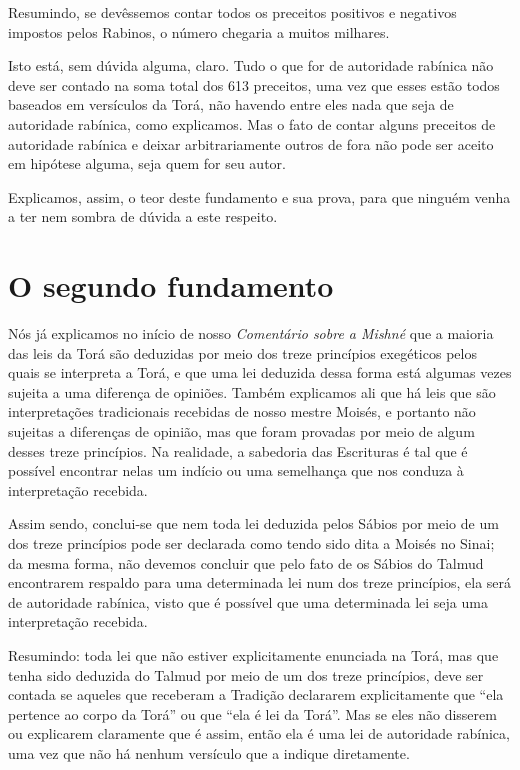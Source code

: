 Resumindo, se devêssemos contar todos os preceitos positivos e
negativos impostos pelos Rabinos, o número chegaria a muitos milhares.

Isto está, sem dúvida alguma, claro. Tudo o que for de autoridade
rabínica não deve ser contado na soma total dos 613 preceitos, uma vez
que esses estão todos baseados em versículos da Torá, não havendo entre
eles nada que seja de autoridade rabínica, como explicamos. Mas o fato
de contar alguns preceitos de autoridade rabínica e deixar
arbitrariamente outros de fora não pode ser aceito em hipótese alguma,
seja quem for seu autor.

Explicamos, assim, o teor deste fundamento e sua prova, para que ninguém
venha a ter nem sombra de dúvida a este respeito.

\chapter*{O segundo fundamento}

Nós já explicamos no início de nosso \emph{Comentário sobre a Mishné}
que a maioria das leis da Torá são deduzidas por meio dos treze
princípios exegéticos pelos quais se interpreta a Torá, e que uma lei
deduzida dessa forma está algumas vezes sujeita a uma diferença de
opiniões. Também explicamos ali que há leis que são interpretações
tradicionais recebidas de nosso mestre Moisés, e portanto não sujeitas
a diferenças de opinião, mas que foram provadas por meio de algum
desses treze princípios. Na realidade, a sabedoria das Escrituras é tal
que é possível encontrar nelas um indício ou uma semelhança que nos
conduza à interpretação recebida.

Assim sendo, conclui-se que nem toda lei deduzida pelos Sábios por meio
de um dos treze princípios pode ser declarada como tendo sido dita a
Moisés no Sinai; da mesma forma, não devemos concluir que pelo fato de
os Sábios do Talmud encontrarem respaldo para uma determinada lei num
dos treze princípios, ela será de autoridade rabínica, visto que é
possível que uma
determinada lei seja uma interpretação recebida.

Resumindo: toda lei que não estiver explicitamente enunciada na Torá,
mas que tenha sido deduzida do Talmud por meio de um dos treze
princípios, deve ser contada se aqueles que receberam a Tradição
declararem explicitamente que ``ela pertence ao corpo da Torá'' ou que
``ela é lei da Torá''. Mas se eles não disserem ou explicarem
claramente que é assim, então ela é uma lei de autoridade rabínica, uma
vez que não há nenhum versículo que a indique diretamente.

